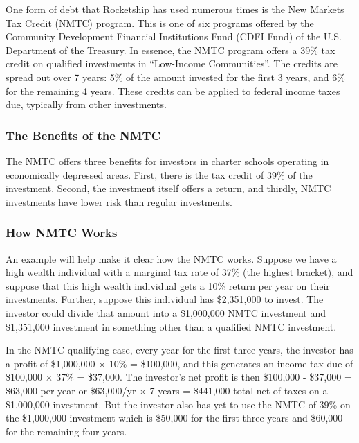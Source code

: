 One form of debt that Rocketship has used numerous times is the New Markets Tax Credit (NMTC) program. This is one of six programs offered by the Community Development Financial Institutions Fund (CDFI Fund) of the U.S. Department of the Treasury. In essence, the NMTC program offers a 39\% tax credit on qualified investments in ``Low-Income Communities''. The credits are spread out over 7 years: 5\% of the amount invested for the first 3 years, and 6\% for the remaining 4 years. These credits can be applied to federal income taxes due, typically from other investments.

\subsubsection{The Benefits of the NMTC}
\label{sec:nmtc-benefits}\indent%

The NMTC offers three benefits for investors in charter schools operating in economically depressed areas. First, there is the tax credit of 39\% of the investment. Second, the investment itself offers a return, and thirdly, NMTC investments have lower risk than regular investments.

\newpage
\subsubsection{How NMTC Works}
\label{sec:how-nmtc-works}\indent%

An example will help make it clear how the NMTC works. Suppose we have a high wealth individual with a marginal tax rate of 37\% (the highest bracket), and suppose that this high wealth individual gets a 10\% return per year on their investments. Further, suppose this individual has \$2,351,000 to invest. The investor could divide that amount into a \$1,000,000 NMTC investment and \$1,351,000 investment in something other than a qualified NMTC investment.

In the NMTC-qualifying case, every year for the first three years, the investor has a profit of \$1,000,000 $\times$ 10\% = \$100,000, and this generates an income tax due of \$100,000 $\times$ 37\% = \$37,000. The investor's net profit is then \$100,000 - \$37,000 = \$63,000 per year or \$63,000/yr $\times$ 7 years = \$441,000 total net of taxes on a \$1,000,000 investment. But the investor also has yet to use the NMTC of 39\% on the \$1,000,000 investment which is \$50,000 for the first three years and \$60,000 for the remaining four years. 

